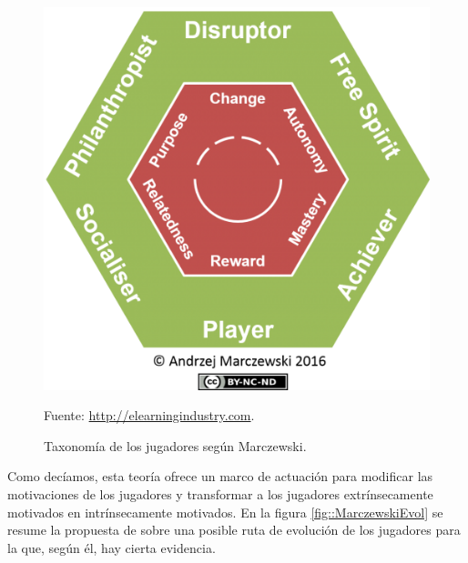 \begin{figure}[hbtp]
\begin{center}
\includegraphics[scale=0.65]{img/Marczewski.jpg}
\caption{Taxonomía de los jugadores según Marczewski.}
\label{fig::Marczewski}
\vspace{-0.25cm}
\small{Fuente: \url{http://elearningindustry.com}.}
\end{center}
\end{figure}
\FloatBarrier

Como decíamos, esta teoría ofrece un marco de actuación para modificar las motivaciones de los jugadores y transformar a los jugadores extrínsecamente motivados en intrínsecamente motivados.
%
En la figura \ref{fig::MarczewskiEvol} se resume la propuesta de  \cite{marczewski} sobre una posible ruta de evolución de los jugadores para la que, según él, hay cierta evidencia.


